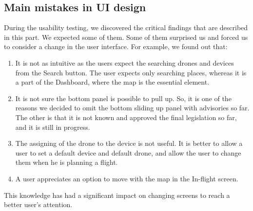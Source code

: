 \subsection{Main mistakes in UI design}\label{subsec:main-mistakes-in-ui-design}
During the usability testing, we discovered the critical findings that are described in this part.
We expected some of them.
Some of them surprised us and forced us to consider a change in the user interface.
For example, we found out that:
\begin{enumerate}
    \item It is not as intuitive as the users expect the searching drones and devices from the Search button.
    The user expects only searching places, whereas it is a part of the Dashboard, where the map is the essential element.
    \item It is not sure the bottom panel is possible to pull up.
    So, it is one of the reasons we decided to omit the bottom sliding up panel with advisories so far.
    The other is that it is not known and approved the final legislation so far, and it is still in progress.
    \item The assigning of the drone to the device is not useful.
    It is better to allow a user to set a default device and default drone, and allow the user to change them when he is planning a flight.
    \item A user appreciates an option to move with the map in the In-flight screen.
\end{enumerate}
This knowledge has had a significant impact on changing screens to reach a better user’s attention.
